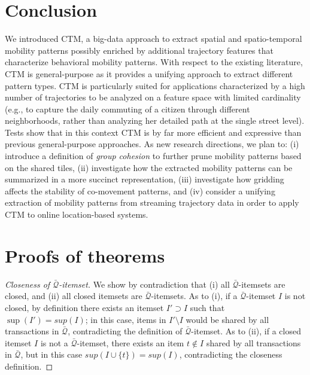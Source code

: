 \documentclass[
]{ceurart}
\newtheorem{proof}{Proof}
\begin{document}
\section{Conclusion}\label{sec:conclusion}
We introduced CTM, a big-data approach to extract spatial and spatio-temporal mobility patterns possibly enriched by additional trajectory features that characterize behavioral mobility patterns.
With respect to the existing literature, CTM is general-purpose as it provides a unifying approach to extract different pattern types.
CTM is particularly suited for applications characterized by a high number of trajectories to be analyzed on a feature space with limited cardinality (e.g., to capture 
the daily commuting of a citizen through different neighborhoods, rather than analyzing her detailed path at the single street level).
Tests show that in this context CTM is by far more efficient and expressive than previous general-purpose approaches.
As new research directions, we plan to: (i) introduce a definition of \textit{group cohesion} to further prune mobility patterns based on the shared tiles, (ii) investigate how the extracted mobility patterns can be summarized in a more succinct representation, (iii) investigate how gridding affects the stability of co-movement patterns, and (iv) consider a unifying extraction of mobility patterns from streaming trajectory data in order to apply CTM to online location-based systems.

\appendix

\section{Proofs of theorems}\label{ap:proof}

\begin{proof}[Closeness of $\bar{\mathcal{Q}}$-itemset]\label{ap:t1}
We show by contradiction that (i) all $\bar{\mathcal{Q}}$-itemsets are closed, and (ii) all closed itemsets are $\bar{\mathcal{Q}}$-itemsets.
As to (i), if a $\bar{\mathcal{Q}}$-itemset $I$ is not closed, by definition there exists an itemset $I' \supset I$ such that $\sup(I')=sup(I)$; in this case, items in $I' \setminus I$ would be shared by all transactions in $\bar{\mathcal{Q}}$, contradicting the definition of $\bar{\mathcal{Q}}$-itemset.
As to (ii), if a closed itemset $I$ is not a $\bar{\mathcal{Q}}$-itemset, there exists an item $t \not \in I$ shared by all transactions in $\bar{\mathcal{Q}}$, but in this case $sup(I \cup \{t\})=sup(I)$, contradicting the closeness definition.
\end{proof}
\end{document}
